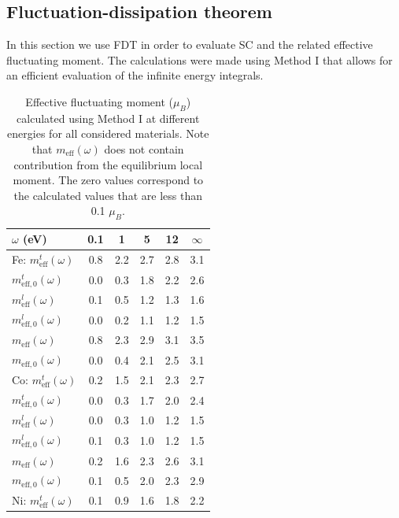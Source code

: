 \subsection{Fluctuation-dissipation theorem}

In this section we use FDT in order to evaluate SC and the related effective fluctuating moment. The calculations were made using Method I that allows for an efficient evaluation of the infinite energy integrals. 

\begin{table}[h!]
\caption{Effective fluctuating moment ($\mu_B$) calculated using Method I at different energies for all considered materials. Note that $m_{\text{eff}}(\omega)$ does not contain contribution from the equilibrium local moment. The zero values correspond to the calculated values that are less than 0.1 $\mu_B$.} 
\begin{center}
\begin{tabular}{l|ccccc}
$\omega$ (eV) & 0.1 & 1 & 5 & 12 & $\infty$ \\
\hline
\hbox{Fe:}  $m_{\text{eff}}^{t}(\omega)$  & 0.8 & 2.2 & 2.7 & 2.8 & 3.1 \\
\phantom{Fe:} $m_{\text{eff},0}^{t}(\omega)$ & 0.0 & 0.3 & 1.8 & 2.2 & 2.6 \\
\phantom{Fe:} $m_{\text{eff}}^{l}(\omega)$  & 0.1 & 0.5 & 1.2 & 1.3 & 1.6 \\
\phantom{Fe:} $m_{\text{eff},0}^{l}(\omega)$ & 0.0 & 0.2 & 1.1 & 1.2 & 1.5 \\
\phantom{Fe:} $m_{\text{eff}}(\omega)$    & 0.8 & 2.3 & 2.9 & 3.1 & 3.5 \\
\phantom{Fe:} $m_{\text{eff},0}(\omega)$   & 0.0 & 0.4 & 2.1 & 2.5 & 3.1 \\
\hline
\hbox{Co:}  $m_{\text{eff}}^{t}(\omega)$  & 0.2 & 1.5 & 2.1 & 2.3 & 2.7 \\
\phantom{Co:} $m_{\text{eff},0}^{t}(\omega)$ & 0.0 & 0.3 & 1.7 & 2.0 & 2.4 \\
\phantom{Co:} $m_{\text{eff}}^{l}(\omega)$  & 0.0 & 0.3 & 1.0 & 1.2 & 1.5 \\
\phantom{Co:} $m_{\text{eff},0}^{l}(\omega)$ & 0.1 & 0.3 & 1.0 & 1.2 & 1.5 \\
\phantom{Co:} $m_{\text{eff}}(\omega)$    & 0.2 & 1.6 & 2.3 & 2.6 & 3.1 \\
\phantom{Co:} $m_{\text{eff},0}(\omega)$   & 0.1 & 0.5 & 2.0 & 2.3 & 2.9 \\
\hline
\hbox{Ni:}  $m_{\text{eff}}^{t}(\omega)$  & 0.1 & 0.9 & 1.6 & 1.8 & 2.2 \\

\end{tabular}
\end{center}
\end{table}
